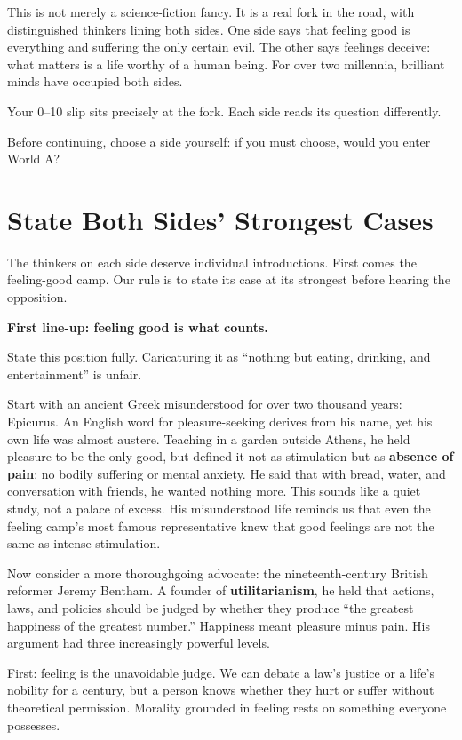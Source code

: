 This is not merely a science-fiction fancy. It is a real fork in the road, with distinguished thinkers lining both sides. One side says that feeling good is everything and suffering the only certain evil. The other says feelings deceive: what matters is a life worthy of a human being. For over two millennia, brilliant minds have occupied both sides.

Your 0--10 slip sits precisely at the fork. Each side reads its question differently.

Before continuing, choose a side yourself: if you must choose, would you enter World A?

\section{State Both Sides' Strongest Cases}
The thinkers on each side deserve individual introductions. First comes the feeling-good camp. Our rule is to state its case at its strongest before hearing the opposition.

\textbf{First line-up: feeling good is what counts.}

State this position fully. Caricaturing it as ``nothing but eating, drinking, and entertainment'' is unfair.

Start with an ancient Greek misunderstood for over two thousand years: Epicurus. An English word for pleasure-seeking derives from his name, yet his own life was almost austere. Teaching in a garden outside Athens, he held pleasure to be the only good, but defined it not as stimulation but as \textbf{absence of pain}: no bodily suffering or mental anxiety. He said that with bread, water, and conversation with friends, he wanted nothing more. This sounds like a quiet study, not a palace of excess. His misunderstood life reminds us that even the feeling camp's most famous representative knew that good feelings are not the same as intense stimulation.

Now consider a more thoroughgoing advocate: the nineteenth-century British reformer Jeremy Bentham. A founder of \textbf{utilitarianism}, he held that actions, laws, and policies should be judged by whether they produce ``the greatest happiness of the greatest number.'' Happiness meant pleasure minus pain. His argument had three increasingly powerful levels.

First: feeling is the unavoidable judge. We can debate a law's justice or a life's nobility for a century, but a person knows whether they hurt or suffer without theoretical permission. Morality grounded in feeling rests on something everyone possesses.

